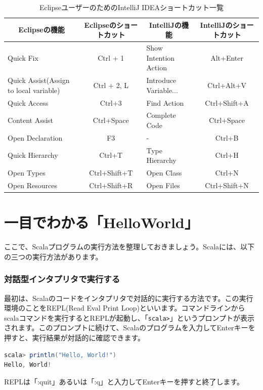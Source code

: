 \documentclass[10pt]{jarticle}
\begin{document}
\begin{table}[htb]
  \caption{EclipseユーザーのためのIntelliJ IDEAショートカット一覧}
  \begin{center}
    \begin{tabular}{|l|c||l|c|} \hline
    \multicolumn{1}{|c|}{Eclipseの機能} & \multicolumn{1}{|c||}{Eclipseのショートカット} & \multicolumn{1}{|c|}{IntelliJの機能} & \multicolumn{1}{|c|}{IntelliJのショートカット} \\ \hline
    Quick Fix & Ctrl + 1 & Show Intention Action & Alt+Enter \\ \hline
    Quick Assist(Assign to local variable) & Ctrl + 2, L & Introduce Variable... & Ctrl+Alt+V \\ \hline
    Quick Access & Ctrl+3 & Find Action  & Ctrl+Shift+A \\ \hline
    Content Assist & Ctrl+Space & Complete Code & Ctrl+Space \\ \hline
    Open Declaration & F3 & - & Ctrl+B \\ \hline
    Quick Hierarchy & Ctrl+T & Type Hierarchy & Ctrl+H \\ \hline  
    Open Types & Ctrl+Shift+T & Open Class & Ctrl+N \\ \hline  
    Open Resources & Ctrl+Shift+R & Open Files & Ctrl+Shift+N \\ \hline 
    \end{tabular}
  \end{center}
  \label{tb:table1}
\end{table}


\part{一目でわかる「HelloWorld」}
ここで、Scalaプログラムの実行方法を整理しておきましょう。Scalaには、以下の三つの実行方法があります。 
\setcounter{section}{0}

\section{対話型インタプリタで実行する}
最初は、Scalaのコードをインタプリタで対話的に実行する方法です。この実行環境のことをREPL(Read Eval Print Loop)といいます。コマンドラインからscalaコマンドを実行するとREPLが起動し、「\verb|scala>|」というプロンプトが表示されます。このプロンプトに続けて、Scalaのプログラムを入力してEnterキーを押すと、実行結果が対話的に確認できます。 
\begin{lstlisting}[language=scala, frame=none]
scala> println("Hello, World!")
Hello, World!
\end{lstlisting}
REPLは「:quit」あるいは「:q」と入力してEnterキーを押すと終了します。 \\
\end{document}
